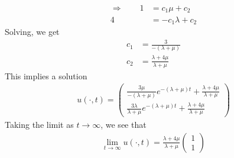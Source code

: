 \documentclass[12pt]{article}
\theoremstyle{plain}
\theoremstyle{definition}
\theoremstyle{remark}
\begin{document}
\begin{enumerate}
\begin{enumerate}
\begin{align*}
      \Rightarrow \qquad
      1 &= c_1 \mu + c_2 \\
      4 &= -c_1 \lambda + c_2
    \end{align*}
    Solving, we get
    \begin{align*}
      c_1 &= \frac{3}{-(\lambda+\mu)} \\
      c_2 &= \frac{\lambda+4\mu}{\lambda+\mu}
    \end{align*}
    This implies a solution
    \begin{align*}
      u(\cdot, t) =
        \begin{pmatrix}
          \frac{3\mu }{-(\lambda+\mu)}  e^{-(\lambda+\mu)t}
            + \frac{\lambda+4\mu}{\lambda+\mu}\\
          \frac{3\lambda }{\lambda+\mu}  e^{-(\lambda+\mu)t}
            + \frac{\lambda+4\mu}{\lambda+\mu}
        \end{pmatrix}
    \end{align*}
    Taking the limit as $t\rightarrow\infty$, we see that
    \begin{align*}
      \lim_{t\rightarrow\infty}u(\cdot, t) =
        \frac{\lambda+4\mu}{\lambda+\mu}
        \begin{pmatrix} 1 \\ 1 \end{pmatrix}
    \end{align*}




  \end{enumerate}


\end{enumerate}
\end{document}
